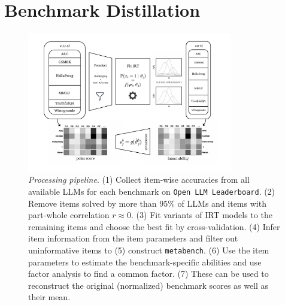 \documentclass{article}
\begin{document}
\section{Benchmark Distillation}
\begin{figure}[h]
   \centering
   \includegraphics[width=0.8\textwidth]{figures/overview.pdf}
   \caption{\textit{Processing pipeline}. (1) Collect item-wise accuracies from all available LLMs for each benchmark on \texttt{Open LLM Leaderboard}. (2) Remove items solved by more than $95\%$ of LLMs and items with part-whole correlation $r \approx 0$. (3) Fit variants of IRT models to the remaining items and choose the best fit by cross-validation. (4) Infer item information from the item parameters and filter out uninformative items to (5) construct \texttt{metabench}. (6) Use the item parameters to estimate the benchmark-specific abilities and use factor analysis to find a common factor. (7) These can be used to reconstruct the original (normalized) benchmark scores as well as their mean.}
   \label{fig:overview}
\end{figure}
\end{document}
